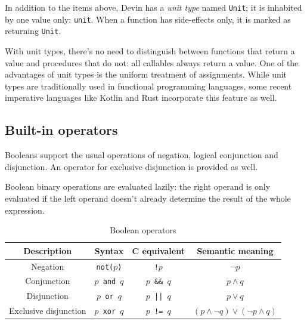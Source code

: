 \documentclass[UdineBachThesis,american,11pt]{PhdThesis}
\begin{document}
  In addition to the items above, Devin has a \emph{unit type} named
  \mbox{\texttt{Unit}}; it is inhabited by one value only: \mbox{\texttt{unit}}.
  When a function has side-effects only, it is marked as returning
  \mbox{\texttt{Unit}}.

  With unit types, there's no need to distinguish between functions that return
  a value and procedures that do not: all callables always return a value. One
  of the advantages of unit types is the uniform treatment of assignments. While
  unit types are traditionally used in functional programming languages, some
  recent imperative languages like Kotlin and Rust incorporate this feature as
  well.

  \subsection{Built-in operators}

  Booleans support the usual operations of negation, logical conjunction and
  disjunction. An operator for exclusive disjunction is provided as well.

  Boolean binary operations are evaluated lazily: the right operand is only
  evaluated if the left operand doesn't already determine the result of the
  whole expression.

  \begin{table}[H]
    \centering

    \begin{tabular}{|c|c|c|c|}
      \hline

      Description &
      Syntax &
      C equivalent &
      Semantic meaning \\
      \hline

      Negation &
      \texttt{not($p$)} &
      \texttt{!$p$} &
      $\lnot p$ \\

      Conjunction &
      \texttt{$p$ and $q$} &
      \texttt{$p$ \&\& $q$} &
      $p \land q$ \\

      Disjunction &
      \texttt{$p$ or $q$} &
      \texttt{$p$ || $q$} &
      $p \lor q$ \\

      Exclusive disjunction &
      \texttt{$p$ xor $q$} &
      \texttt{$p$ != $q$} &
      $\left(p \land \lnot q\right) \lor \left(\lnot p \land q\right)$ \\
      \hline
    \end{tabular}

    \caption{Boolean operators}
  \end{table}
\end{document}
